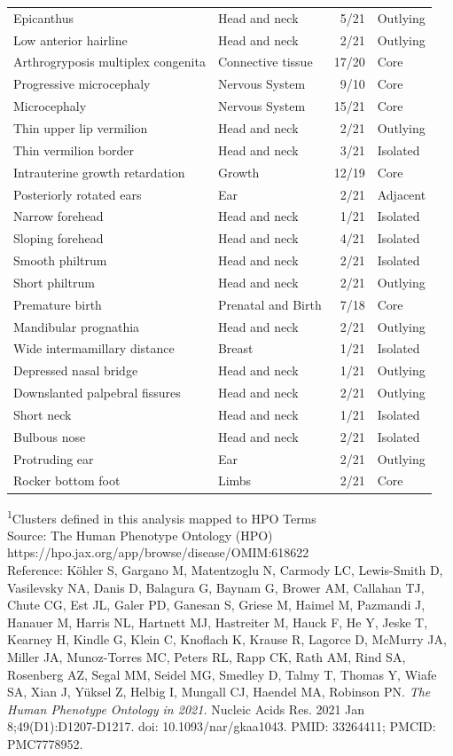 \documentclass[
  authoryear,
  preprint,
  3p]{elsarticle}
\begin{document}
\begin{longtable}{llrl}
Epicanthus & Head and neck & 5/21 & Outlying \\ 
Low anterior hairline & Head and neck & 2/21 & Outlying \\ 
Arthrogryposis multiplex congenita & Connective tissue & 17/20 & Core \\ 
Progressive microcephaly & Nervous System & 9/10 & Core \\ 
Microcephaly & Nervous System & 15/21 & Core \\ 
Thin upper lip vermilion & Head and neck & 2/21 & Outlying \\ 
Thin vermilion border & Head and neck & 3/21 & Isolated \\ 
Intrauterine growth retardation & Growth & 12/19 & Core \\ 
Posteriorly rotated ears & Ear & 2/21 & Adjacent \\ 
Narrow forehead & Head and neck & 1/21 & Isolated \\ 
Sloping forehead & Head and neck & 4/21 & Isolated \\ 
Smooth philtrum & Head and neck & 2/21 & Isolated \\ 
Short philtrum & Head and neck & 2/21 & Outlying \\ 
Premature birth & Prenatal and Birth & 7/18 & Core \\ 
Mandibular prognathia & Head and neck & 2/21 & Outlying \\ 
Wide intermamillary distance & Breast & 1/21 & Isolated \\ 
Depressed nasal bridge & Head and neck & 1/21 & Outlying \\ 
Downslanted palpebral fissures & Head and neck & 2/21 & Outlying \\ 
Short neck & Head and neck & 1/21 & Isolated \\ 
Bulbous nose & Head and neck & 2/21 & Isolated \\ 
Protruding ear & Ear & 2/21 & Outlying \\ 
Rocker bottom foot & Limbs & 2/21 & Core \\ 
\bottomrule
\end{longtable}
\begin{minipage}{\linewidth}
\textsuperscript{1}Clusters defined in this analysis mapped to HPO Terms\\
Source: The Human Phenotype Ontology (HPO) https://hpo.jax.org/app/browse/disease/OMIM:618622 \\
Reference: Köhler S, Gargano M, Matentzoglu N, Carmody LC, Lewis-Smith D, Vasilevsky NA, Danis D, Balagura G, Baynam G, Brower AM, Callahan TJ, Chute CG, Est JL, Galer PD, Ganesan S, Griese M, Haimel M, Pazmandi J, Hanauer M, Harris NL, Hartnett MJ, Hastreiter M, Hauck F, He Y, Jeske T, Kearney H, Kindle G, Klein C, Knoflach K, Krause R, Lagorce D, McMurry JA, Miller JA, Munoz-Torres MC, Peters RL, Rapp CK, Rath AM, Rind SA, Rosenberg AZ, Segal MM, Seidel MG, Smedley D, Talmy T, Thomas Y, Wiafe SA, Xian J, Yüksel Z, Helbig I, Mungall CJ, Haendel MA, Robinson PN. \emph{The Human Phenotype Ontology in 2021.} Nucleic Acids Res. 2021 Jan 8;49(D1):D1207-D1217. doi: {10.1093/nar/gkaa1043}. PMID: 33264411; PMCID: PMC7778952.\\
\end{minipage}
\end{document}

